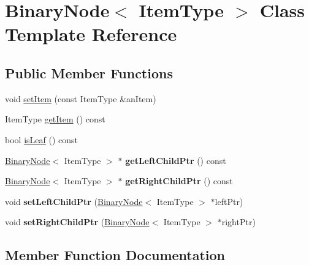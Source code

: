 \hypertarget{class_binary_node}{}\section{Binary\+Node$<$ Item\+Type $>$ Class Template Reference}
\label{class_binary_node}
\subsection*{Public Member Functions}
\begin{DoxyCompactItemize}
\item 
void \hyperlink{class_binary_node_ab731c8cf87040e19ecba80f407b4d9b1}{set\+Item} (const Item\+Type \&an\+Item)
\item 
Item\+Type \hyperlink{class_binary_node_a10780d779ff7a9c51473715967a7a439}{get\+Item} () const
\item 
bool \hyperlink{class_binary_node_a837d4805b46040906b8c5a331e73abee}{is\+Leaf} () const
\item 
\hypertarget{class_binary_node_acf93048be8864cf90c02dca1106902df}{}\label{class_binary_node_acf93048be8864cf90c02dca1106902df} 
\hyperlink{class_binary_node}{Binary\+Node}$<$ Item\+Type $>$ $\ast$ {\bfseries get\+Left\+Child\+Ptr} () const
\item 
\hypertarget{class_binary_node_ad96f01da47b6786a5f4f384380755c96}{}\label{class_binary_node_ad96f01da47b6786a5f4f384380755c96} 
\hyperlink{class_binary_node}{Binary\+Node}$<$ Item\+Type $>$ $\ast$ {\bfseries get\+Right\+Child\+Ptr} () const
\item 
\hypertarget{class_binary_node_aa36a2b61c6b76aeb79465776c80d5c49}{}\label{class_binary_node_aa36a2b61c6b76aeb79465776c80d5c49} 
void {\bfseries set\+Left\+Child\+Ptr} (\hyperlink{class_binary_node}{Binary\+Node}$<$ Item\+Type $>$ $\ast$left\+Ptr)
\item 
\hypertarget{class_binary_node_a2252f471ea06bb2568b6c2af5ece23f6}{}\label{class_binary_node_a2252f471ea06bb2568b6c2af5ece23f6} 
void {\bfseries set\+Right\+Child\+Ptr} (\hyperlink{class_binary_node}{Binary\+Node}$<$ Item\+Type $>$ $\ast$right\+Ptr)
\end{DoxyCompactItemize}


\subsection{Member Function Documentation}
\hypertarget{class_binary_node_a10780d779ff7a9c51473715967a7a439}{}\label{class_binary_node_a10780d779ff7a9c51473715967a7a439} 
